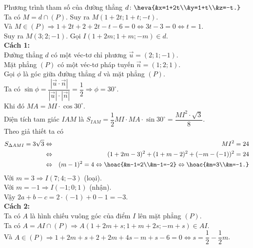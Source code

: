 \begin{ex}
{\begin{center}
\begin{tikzpicture}[line cap=round,line join=round,font=\footnotesize,>=stealth,scale=.8]
			\end{tikzpicture}
		\end{center}
		Phương trình tham số của đường thẳng $d\colon \heva{&x=1+2t\\&y=1+t\\&z=-t.}$\\
		Ta có $M=d\cap(P)$. Suy ra $M(1+2t;1+t;-t)$.\\
		Và $M \in(P) \Rightarrow 1+2 t+2+2 t-t-6=0 \Leftrightarrow 3 t-3=0 \Leftrightarrow t=1$.\\
		Suy ra $M(3;2;-1)$.
		Gọi $I(1+2m;1+m;-m) \in d$.\\
		{\bf Cách 1:}\\
		Đường thẳng $d$ có một véc-tơ chỉ phương $\overrightarrow{u}=(2;1;-1)$.\\
		Mặt phẳng $(P)$ có một véc-tơ pháp tuyến $\overrightarrow{n}=(1;2;1)$.\\
		Gọi $\phi$ là góc giữa đường thẳng $ d $ và mặt phẳng $(P)$.\\
		Ta có $\sin \phi =\dfrac{\left|\overrightarrow{u}\cdot \overrightarrow{n} \right|}{\left|\overrightarrow{u} \right|\cdot \left| \overrightarrow{n} \right|} =\dfrac{1}{2}\Rightarrow \phi=30^{\circ} $.\\
		Khi đó $ MA=MI \cdot \cos 30^{\circ} $.\\
		Diện tích tam giác $IAM$ là $S_{IAM}=\dfrac{1}{2}MI \cdot MA\cdot\sin {30^\circ}=\dfrac{MI^2\cdot \sqrt{3}}{8}$.\\
		Theo giả thiết ta có
		\allowdisplaybreaks
		\begin{eqnarray*}
			S_{\Delta AMI}=3\sqrt{3} &\Leftrightarrow& MI^2=24\\
			&\Leftrightarrow&(1+2m-3)^2+(1+m-2)^2+(-m-(-1))^2=24\\
			&\Leftrightarrow&  (m-1)^2=4 \Leftrightarrow\hoac{&m-1=2\\&m-1=-2} \Leftrightarrow \hoac{&m=3\\&m=-1.}
		\end{eqnarray*}
		Với $m=3 \Rightarrow I(7;4;-3)$ (loại).\\
		Với $m=-1 \Rightarrow I(-1;0;1)$ (nhận).\\
		Vậy $2 a+b-c=2 \cdot(-1)+0-1=-3$.\\
		{\bf Cách 2:}\\
		Ta có $A$ là hình chiếu vuông góc của điểm $I$ lên mặt phẳng $(P)$.\\
		Ta có $A=A I \cap(P) \Rightarrow A(1+2 m+s;1+m+2s;-m+s) \in A I$.\\
		Và $A \in(P) \Rightarrow 1+2 m+s+2+2 m+4 s-m+s-6=0 \Leftrightarrow s=\dfrac{1}{2}-\dfrac{1}{2} m$.\\
}
\end{ex}
